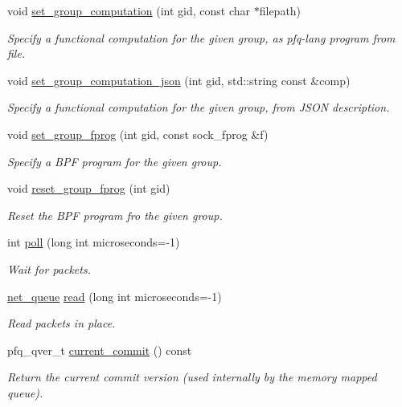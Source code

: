 \begin{DoxyCompactItemize}
void \hyperlink{classpfq_1_1socket_acb1eaaaadbcbbee8b5f2054b01e51fda}{set\+\_\+group\+\_\+computation} (int gid, const char $\ast$filepath)
\begin{DoxyCompactList}\small\item\em Specify a functional computation for the given group, as pfq-\/lang program from file. \end{DoxyCompactList}\item 
void \hyperlink{classpfq_1_1socket_ac60650eec56374ac4be3c69b43255b85}{set\+\_\+group\+\_\+computation\+\_\+json} (int gid, std\+::string const \&comp)
\begin{DoxyCompactList}\small\item\em Specify a functional computation for the given group, from J\+S\+ON description. \end{DoxyCompactList}\item 
void \hyperlink{classpfq_1_1socket_ad618894910a12a08eaed3d8668db25af}{set\+\_\+group\+\_\+fprog} (int gid, const sock\+\_\+fprog \&f)
\begin{DoxyCompactList}\small\item\em Specify a B\+PF program for the given group. \end{DoxyCompactList}\item 
void \hyperlink{classpfq_1_1socket_a2327e71a6f94e54efb0da5ec36b1c620}{reset\+\_\+group\+\_\+fprog} (int gid)
\begin{DoxyCompactList}\small\item\em Reset the B\+PF program fro the given group. \end{DoxyCompactList}\item 
int \hyperlink{classpfq_1_1socket_ad8ce551ea07f39317bb383ab88d66344}{poll} (long int microseconds=-\/1)
\begin{DoxyCompactList}\small\item\em Wait for packets. \end{DoxyCompactList}\item 
\hyperlink{classpfq_1_1net__queue}{net\+\_\+queue} \hyperlink{classpfq_1_1socket_a6004249d3abfe8a2329b44ba797d1909}{read} (long int microseconds=-\/1)
\begin{DoxyCompactList}\small\item\em Read packets in place. \end{DoxyCompactList}\item 
pfq\+\_\+qver\+\_\+t \hyperlink{classpfq_1_1socket_ada49e068e1b04c22838a3fae5d629590}{current\+\_\+commit} () const
\begin{DoxyCompactList}\small\item\em Return the current commit version (used internally by the memory mapped queue). \end{DoxyCompactList}\item 

\end{DoxyCompactItemize}
